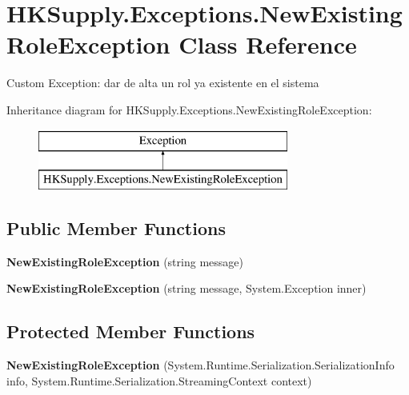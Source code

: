 \hypertarget{class_h_k_supply_1_1_exceptions_1_1_new_existing_role_exception}{}\section{H\+K\+Supply.\+Exceptions.\+New\+Existing\+Role\+Exception Class Reference}
\label{class_h_k_supply_1_1_exceptions_1_1_new_existing_role_exception}


Custom Exception\+: dar de alta un rol ya existente en el sistema  


Inheritance diagram for H\+K\+Supply.\+Exceptions.\+New\+Existing\+Role\+Exception\+:\begin{figure}[H]
\begin{center}
\leavevmode
\includegraphics[height=2.000000cm]{class_h_k_supply_1_1_exceptions_1_1_new_existing_role_exception}
\end{center}
\end{figure}
\subsection*{Public Member Functions}
\begin{DoxyCompactItemize}
\item 
\mbox{\label{class_h_k_supply_1_1_exceptions_1_1_new_existing_role_exception_a3a48fc075f0377064ce7394fd9123f2e}} 
{\bfseries New\+Existing\+Role\+Exception} (string message)
\item 
\mbox{\label{class_h_k_supply_1_1_exceptions_1_1_new_existing_role_exception_a5d31e75345337147a74a40e9b2d657b6}} 
{\bfseries New\+Existing\+Role\+Exception} (string message, System.\+Exception inner)
\end{DoxyCompactItemize}
\subsection*{Protected Member Functions}
\begin{DoxyCompactItemize}
\item 
\mbox{\label{class_h_k_supply_1_1_exceptions_1_1_new_existing_role_exception_ae2c332b45921778b7d21a4915135b29a}} 
{\bfseries New\+Existing\+Role\+Exception} (System.\+Runtime.\+Serialization.\+Serialization\+Info info, System.\+Runtime.\+Serialization.\+Streaming\+Context context)
\end{DoxyCompactItemize}


